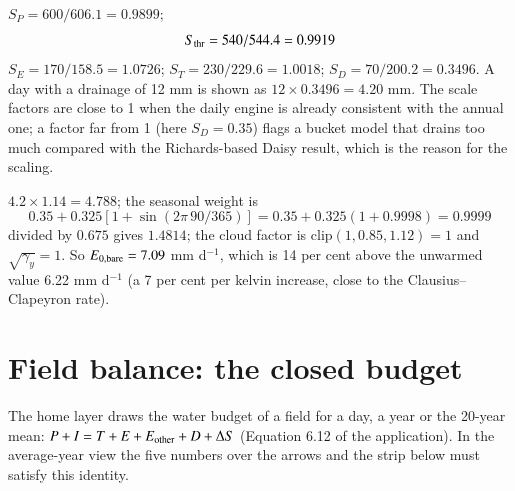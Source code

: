 \sol {}\ans $S_P=600/606.1=0.9899$; \[S_{\rm thr}=540/544.4=0.9919\]
$S_E=170/158.5=1.0726$; $S_T=230/229.6=1.0018$; $S_D=70/200.2=0.3496$. A day with a drainage of 12 mm is shown as $12\times0.3496=4.20$ mm. The scale factors are close to 1 when the daily engine is already consistent with the annual one; a factor far from 1 (here $S_D=0.35$) flags a bucket model that drains too much compared with the Richards-based Daisy result, which is the reason for the scaling. \finans


\sol {}\ans $4.2\times1.14=4.788$; the seasonal weight is \[0.35+0.325[1+\sin(2\pi\,90/365)]=0.35+0.325(1+0.9998)=0.9999\]
divided by $0.675$ gives $1.4814$; the cloud factor is $\mathrm{clip}(1,0.85,1.12)=1$ and $\sqrt{\gamma_y}=1$. So $E_{0,\rm bare}=7.09$ mm d$^{-1}$, which is 14 per cent above the unwarmed value 6.22 mm d$^{-1}$ (a 7 per cent per kelvin increase, close to the Clausius--Clapeyron rate).
\label{ch:bal}
\section{Field balance: the closed budget}\label{sec:closure}
The home layer draws the water budget of a field for a day, a year or the 20-year mean: $P+I=T+E+E_{\rm other}+D+\Delta S$ (Equation 6.12 of the application). In the average-year view the five numbers over the arrows and the strip below must satisfy this identity. \finans

